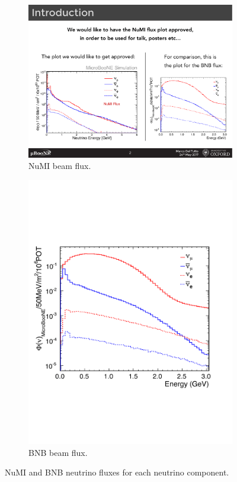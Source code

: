 \begin{figure}[htbp]
\centering
  \begin{subfigure}{0.45\textwidth}
    \includegraphics[width=\linewidth]{figures/numi.pdf}
    \caption{NuMI beam flux.} 
  \end{subfigure}
    \begin{subfigure}{0.45\textwidth}
    \includegraphics[width=\linewidth]{figures/bnb.pdf}
    \caption{BNB beam flux.} 
  \end{subfigure}
  \caption{NuMI and BNB neutrino fluxes for each neutrino component.}\label{fig:numibeam}
\end{figure}

